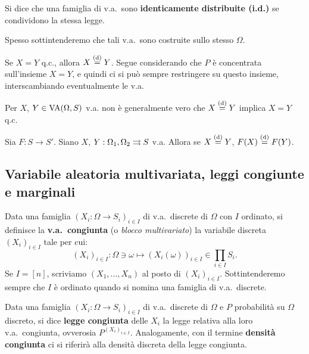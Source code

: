 \begin{multicols*}{2}
\begin{definition}
    Si dice che una famiglia di v.a.~sono \textbf{identicamente distribuite (i.d.)}
    se condividono la stessa legge. \smallskip


    Spesso sottintenderemo che tali v.a.~sono costruite sullo stesso $\Omega$.
\end{definition}

\begin{proposition}
    Se $X = Y$ q.c., allora $X \overset{\mathrm{(d)}}{=} Y$. Segue considerando che
    $P$ è concentrata sull'insieme $X=Y$, e quindi ci si può sempre
    restringere su questo insieme, interscambiando eventualmente
    le v.a.
\end{proposition}

\begin{remark}
    Per $X$, $Y \in \operatorname{VA}(\Omega, S)$ v.a. non è generalmente vero che
    $X \overset{\mathrm{(d)}}{=} Y$ implica $X = Y$ q.c. 
\end{remark}

\begin{proposition}
    Sia $F : S \to S'$. Siano $X$, $Y : \Omega_1, \Omega_2 \rightrightarrows S$ v.a. Allora
    se $X \overset{\mathrm{(d)}}{=} Y$, $F(X) \overset{\mathrm{(d)}}{=} F(Y)$.
\end{proposition}

\subsection{Variabile aleatoria multivariata, leggi congiunte e marginali}

\begin{definition}
    Data una famiglia $(X_i : \Omega \to S_i)_{i \in I}$ di
    v.a.~discrete di $\Omega$ con $I$ ordinato, si definisce la \textbf{v.a.~congiunta} (o
    \textit{blocco multivariato}) la variabile discreta $(X_i)_{i \in I}$ tale per cui:
    \[
        (X_i)_{i \in I} : \Omega \ni \omega \mapsto (X_i(\omega))_{i \in I} \in \prod_{i \in I} S_i.
    \]
    Se $I = [n]$, scriviamo $(X_1, \ldots, X_n)$ al posto di $(X_i)_{i \in I}$.
    Sottintenderemo sempre che $I$ è ordinato quando si nomina una famiglia
    di v.a.~discrete.
\end{definition}

\begin{definition}
    Data una famiglia $(X_i : \Omega \to S_i)_{i \in I}$ di
    v.a.~discrete di $\Omega$ e $P$ probabilità su $\Omega$ discreto,
    si dice \textbf{legge congiunta} delle $X_i$
    la legge relativa alla loro v.a.~congiunta, ovverosia
    $P^{(X_i)_{i \in I}}$. Analogamente, con il
    termine \textbf{densità congiunta} ci si riferirà
    alla densità discreta della legge congiunta.
\end{definition}


\end{multicols*}
